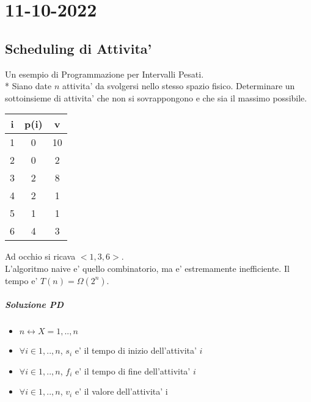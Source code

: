 \chapter{11-10-2022}

\section{Scheduling di Attivita'}
Un esempio di Programmazione per Intervalli Pesati. \\*
Siano date $n$ attivita' da svolgersi nello stesso spazio fisico.
Determinare un sottoinsieme di attivita' che non si sovrappongono e che sia il massimo possibile.

\begin{center}
    \begin{tabular}{||c c c||}
        \hline
        i & p(i) & v \\
        \hline
        \hline
        1 & 0 & 10 \\
        \hline
        2 & 0 & 2 \\
        \hline
        3 & 2 & 8 \\
        \hline
        4 & 2 & 1 \\
        \hline
        5 & 1 & 1 \\
        \hline
        6 & 4 & 3 \\
        \hline
    \end{tabular}
\end{center}

Ad occhio si ricava $<1, 3, 6>$. \\

L'algoritmo naive e' quello combinatorio, ma e' estremamente inefficiente. Il tempo e' $T(n) = \Omega(2^n)$.

\paragraph{Soluzione PD}

\begin{itemize}
    \item $n \leftrightarrow X = {1,..,n}$
    \item $\forall i \in {1,..,n}$, $s _ {i}$ e' il tempo di inizio dell'attivita' $i$
    \item $\forall i \in {1,..,n}$, $f _ {i}$ e' il tempo di fine dell'attivita' $i$
    \item $\forall i \in {1,..,n}$, $v _ {i}$ e' il valore dell'attivita' i
\end{itemize}

